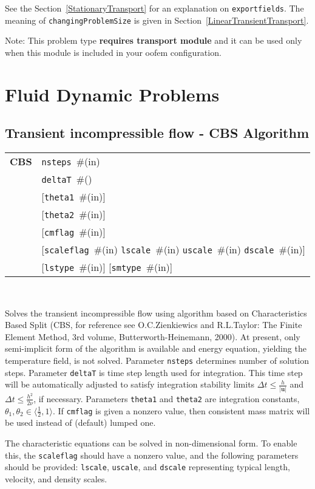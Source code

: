 \documentclass[a4paper]{report}
\newcommand{\mbf}[1]{\boldsymbol{#1}}
\newcommand{\param}[1]{\texttt{#1}} %
\newcommand{\optional}[1]{[#1]} %
\newcommand{\field}[2]{\param{#1}~\#{\tiny(#2)}} %
\newcommand{\optField}[2]{\optional{\field{#1}{#2}}}
\newcommand{\entKeywordInst}[1]{\textbf{#1}} %
\newenvironment{record}[1][]{\begin{tabular}{|ll}}{\end{tabular}\\}
\newcommand{\recentry}[2]{{#1}&{#2}\\}
\newcounter{rcc}
\newenvironment{record}[1][\textwidth]{\setcounter{rcc}{0}\rowcolors{1}{lightgray}{lightgray}\tabularx{#1}{llR} \hline}
               {\endtabularx}
\newcommand{\recentry}[2]{\ifthenelse{\value{rcc}>0}{$\backslash$ \\}{\setcounter{rcc}{1}}{#1}&{#2}&}
\begin{document}
See the Section~\ref{StationaryTransport} for an explanation on
\param{exportfields}. The meaning 
of \param{changingProblemSize} is given in Section~\ref{LinearTransientTransport}.

Note: This problem type \textbf{requires transport module} and it
can be used only when this module is included in your oofem
configuration.

\section{Fluid Dynamic Problems}
\subsection{Transient incompressible flow - CBS Algorithm}
\label{cbsIncomp}
\begin{record}
  \recentry{\entKeywordInst{CBS}}{\field{nsteps}{in}}
  \recentry{}{\field{deltaT}{}}
  \recentry{}{\optField{theta1}{in}}
  \recentry{}{\optField{theta2}{in}}
  \recentry{}{\optField{cmflag}{in}}
  \recentry{}{[\field{scaleflag}{in} \field{lscale}{in} \field{uscale}{in} \field{dscale}{in}]}
  \recentry{}{\optField{lstype}{in} \optField{smtype}{in}}
\end{record}

Solves the transient incompressible flow using algorithm based on
Characteristics Based Split (CBS, for reference see O.C.Zienkiewics
and R.L.Taylor: The Finite Element Method, 3rd volume,
Butterworth-Heinemann, 2000). At present, only semi-implicit form
of the algorithm is available and energy equation, yielding the
temperature field, is not solved.
Parameter \param{nsteps} determines number of solution
steps. Parameter \param{deltaT} is time step length used for
integration. This time step will be automatically adjusted to satisfy
integration stability limits $\Delta t \le {\frac{h}{\vert\mbf{u}\vert}}$ and $\Delta t \le {\frac{h^2}{2\nu}}$, if necessary.
Parameters \param{theta1} and \param{theta2} are integration constants, $\theta_1, \theta_2 \in \langle{\frac12}, 1\rangle$.
If \param{cmflag} is given a nonzero value, then
consistent mass matrix will be used instead of (default) lumped one.

The characteristic equations can be solved in non-dimensional form. To
enable this, the \param{scaleflag} should have a nonzero value,
and the following parameters should be provided: \param{lscale},
\param{uscale}, and \param{dscale} representing typical length,
velocity, and density scales.
\end{document}
